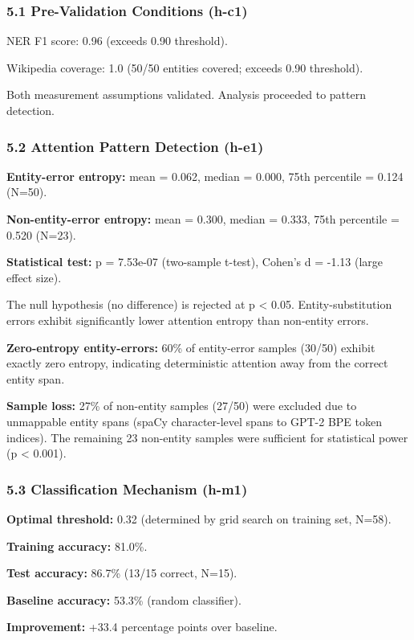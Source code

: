 
\subsubsection{5.1 Pre-Validation Conditions (h-c1)}

NER F1 score: 0.96 (exceeds 0.90 threshold).

Wikipedia coverage: 1.0 (50/50 entities covered; exceeds 0.90 threshold).

Both measurement assumptions validated. Analysis proceeded to pattern detection.

\subsubsection{5.2 Attention Pattern Detection (h-e1)}

\textbf{Entity-error entropy:} mean = 0.062, median = 0.000, 75th percentile = 0.124 (N=50).

\textbf{Non-entity-error entropy:} mean = 0.300, median = 0.333, 75th percentile = 0.520 (N=23).

\textbf{Statistical test:} p = 7.53e-07 (two-sample t-test), Cohen's d = -1.13 (large effect size).

The null hypothesis (no difference) is rejected at p < 0.05. Entity-substitution errors exhibit significantly lower attention entropy than non-entity errors.

\textbf{Zero-entropy entity-errors:} 60\% of entity-error samples (30/50) exhibit exactly zero entropy, indicating deterministic attention away from the correct entity span.

\textbf{Sample loss:} 27\% of non-entity samples (27/50) were excluded due to unmappable entity spans (spaCy character-level spans to GPT-2 BPE token indices). The remaining 23 non-entity samples were sufficient for statistical power (p < 0.001).

\subsubsection{5.3 Classification Mechanism (h-m1)}

\textbf{Optimal threshold:} 0.32 (determined by grid search on training set, N=58).

\textbf{Training accuracy:} 81.0\%.

\textbf{Test accuracy:} 86.7\% (13/15 correct, N=15).

\textbf{Baseline accuracy:} 53.3\% (random classifier).

\textbf{Improvement:} +33.4 percentage points over baseline.


